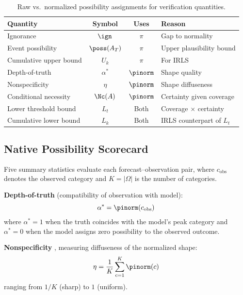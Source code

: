 \begin{table}[htbp]
\centering
\caption{Raw vs.\ normalized possibility assignments for verification quantities.}
\label{tab:raw_norm}
\small
\begin{tabularx}{\columnwidth}{>{\raggedright\arraybackslash}p{}ccX}
\toprule
Quantity & Symbol & Uses & Reason \\
\midrule
Ignorance & $\ign$ & $\pi$ & Gap to normality \\
Event possibility & $\poss(A_T)$ & $\pi$ & Upper plausibility bound \\
Cumulative upper bound & $U_k$ & $\pi$ & For IRLS \\
Depth-of-truth & $\alpha^*$ & $\pinorm$ & Shape quality \\
Nonspecificity & $\eta$ & $\pinorm$ & Shape diffuseness \\
Conditional necessity & $\Nc(A)$ & $\pinorm$ & Certainty given coverage \\
Lower threshold bound & $L_t$ & Both & Coverage $\times$ certainty \\
Cumulative lower bound & $L_k$ & Both & IRLS counterpart of $L_t$ \\
\bottomrule
\end{tabularx}
\end{table}

\subsection{Native Possibility Scorecard}\label{sec:native_scorecard}

Five summary statistics evaluate each forecast--observation pair, where $c_{\mathrm{obs}}$ denotes the observed category and $K = |\Omega|$ is the number of categories.

\textbf{Depth-of-truth} (compatibility of observation with model):
\begin{equation}
\alpha^* = \pinorm(c_{\mathrm{obs}}) \label{eq:alpha_star}
\end{equation}
where $\alpha^* = 1$ when the truth coincides with the model's peak category and $\alpha^* = 0$ when the model assigns zero possibility to the observed outcome.

\textbf{Nonspecificity} \citep{Klir1995-va}, measuring diffuseness of the normalized shape:
\begin{equation}
\eta = \frac{1}{K} \sum_{c=1}^{K} \pinorm(c) \label{eq:ns}
\end{equation}
ranging from $1/K$ (sharp) to $1$ (uniform).

